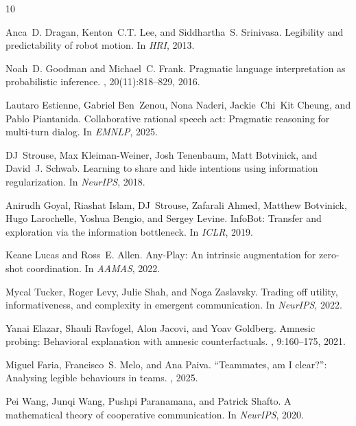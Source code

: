 \documentclass[sigconf,review,anonymous]{acmart}
\begin{document}

\begin{thebibliography}{10}

Anca~D. Dragan, Kenton~C.T. Lee, and Siddhartha~S. Srinivasa.
\newblock Legibility and predictability of robot motion.
\newblock In {\em HRI}, 2013.

Noah~D. Goodman and Michael~C. Frank.
\newblock Pragmatic language interpretation as probabilistic inference.
, 20(11):818--829, 2016.

Lautaro Estienne, Gabriel Ben~Zenou, Nona Naderi, Jackie~Chi~Kit Cheung, and Pablo Piantanida.
\newblock Collaborative rational speech act: Pragmatic reasoning for multi-turn dialog.
\newblock In {\em EMNLP}, 2025.

DJ~Strouse, Max Kleiman-Weiner, Josh Tenenbaum, Matt Botvinick, and David~J. Schwab.
\newblock Learning to share and hide intentions using information regularization.
\newblock In {\em NeurIPS}, 2018.

Anirudh Goyal, Riashat Islam, DJ~Strouse, Zafarali Ahmed, Matthew Botvinick, Hugo Larochelle, Yoshua Bengio, and Sergey Levine.
\newblock InfoBot: Transfer and exploration via the information bottleneck.
\newblock In {\em ICLR}, 2019.

Keane Lucas and Ross~E. Allen.
\newblock Any-Play: An intrinsic augmentation for zero-shot coordination.
\newblock In {\em AAMAS}, 2022.

Mycal Tucker, Roger Levy, Julie Shah, and Noga Zaslavsky.
\newblock Trading off utility, informativeness, and complexity in emergent communication.
\newblock In {\em NeurIPS}, 2022.

Yanai Elazar, Shauli Ravfogel, Alon Jacovi, and Yoav Goldberg.
\newblock Amnesic probing: Behavioral explanation with amnesic counterfactuals.
, 9:160--175, 2021.

Miguel Faria, Francisco~S. Melo, and Ana Paiva.
\newblock ``Teammates, am I clear?'': Analysing legible behaviours in teams.
, 2025.

Pei Wang, Junqi Wang, Pushpi Paranamana, and Patrick Shafto.
\newblock A mathematical theory of cooperative communication.
\newblock In {\em NeurIPS}, 2020.


\end{thebibliography}
\end{document}
